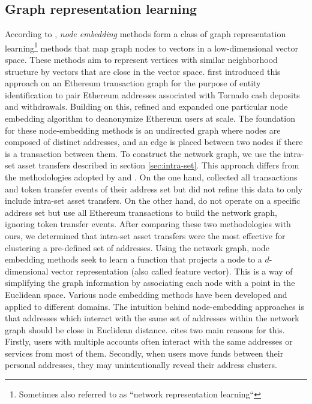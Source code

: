 \documentclass[12pt,a4paper,titlepage,oneside,english]{article}
\begin{document}
\subsection{Graph representation learning}
\label{sec:node}
According to \cite{Beres2020}, \textit{node embedding} methods form a class of graph representation learning\footnote{Sometimes also referred to as ``network representation learning``} methods that map graph nodes to vectors in a low-dimensional vector space. These methods aim to represent vertices with similar neighborhood structure by vectors that are close in the vector space. \newline
\cite{Beres2020} first introduced this approach on an Ethereum transaction graph for the purpose of entity identification to pair Ethereum addresses associated with Tornado cash deposits and withdrawals. Building on this, \cite{wu2022tutela} refined and expanded one particular node embedding algorithm to deanonymize Ethereum users at scale. \newline
The foundation for these node-embedding methods is an undirected graph where nodes are composed of distinct addresses, and an edge is placed between two nodes if there is a transaction between them. \newline
To construct the network graph, we use the intra-set asset transfers described in section \ref{sec:intra-set}. This approach differs from the methodologies adopted by \cite{Beres2020} and \cite{wu2022tutela}. On the one hand, \cite{Beres2020} collected all transactions and token transfer events of their address set but did not refine this data to only include intra-set asset transfers. On the other hand, \cite{wu2022tutela} do not operate on a specific address set but use all Ethereum transactions to build the network graph, ignoring token transfer events. After comparing these two methodologies with ours, we determined that intra-set asset transfers were the most effective for clustering a pre-defined set of addresses. %
\newline
Using the network graph, node embedding methods seek to learn a function that projects a node to a $d$-dimensional vector representation (also called feature vector). This is a way of simplifying the graph information by associating each node with a point in the Euclidean space. Various node embedding methods have been developed and applied to different domains. \citep{rozemberczki2020difftovec} \newline
The intuition behind node-embedding approaches is that addresses which interact with the same set of addresses within the network graph should be close in Euclidean distance. \cite{Beres2020} cites two main reasons for this. Firstly, users with multiple accounts often interact with the same addresses or services from most of them. Secondly, when users move funds between their personal addresses, they may unintentionally reveal their address clusters. \newline
\end{document}
